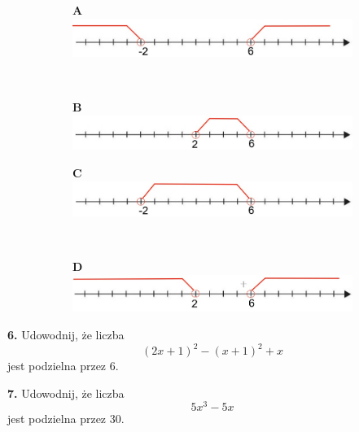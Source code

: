 \documentclass[12pt,a4paper]{article}
\theoremstyle{break}
\begin{document}
\begin{figure}[h]
	\centering
	\begin{subfigure}[b]{0.45\textwidth}
		\Large \textbf{A}
		\includegraphics[width=\textwidth]{z1_2_1.jpeg}
		
	\end{subfigure}$\quad$
	\begin{subfigure}[b]{0.45\textwidth}
		\Large \textbf{B}
		\includegraphics[width=\textwidth]{z1_2_2.jpeg}
		
	\end{subfigure}
\end{figure}
\begin{figure}[h]
	\centering
	\begin{subfigure}[b]{0.45\textwidth}
		\Large \textbf{C}
		\includegraphics[width=\textwidth]{z1_2_3.jpeg}
		
	\end{subfigure}$\quad$
	\begin{subfigure}[b]{0.45\textwidth}
		\Large \textbf{D}
		\includegraphics[width=\textwidth]{z1_2_4.jpeg}
	\end{subfigure}
\end{figure}

\begin{mdframed}[style=zad]
	\vspace{0.2cm}
	\textbf{6.} Udowodnij, że liczba $$(2x+1)^2-(x+1)^2+x$$ jest podzielna przez 6. 
\end{mdframed}

\begin{mdframed}[style=zad]
	\vspace{0.2cm}
	\textbf{7.} Udowodnij, że liczba $$5x^3-5x$$ jest podzielna przez 30. 
\end{mdframed} 
\end{document}

